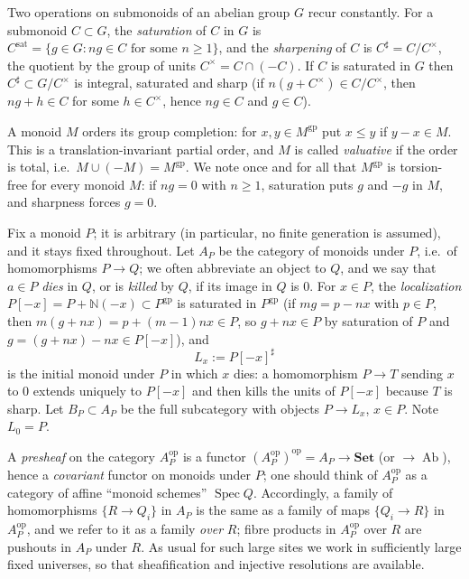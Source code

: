 \documentclass[12pt]{article}
\newcommand{\N}{\mathbb N}
\newcommand{\gp}{\mathrm{gp}}
\newcommand{\sat}{\mathrm{sat}}
\newcommand{\Ab}{\operatorname{Ab}}
\theoremstyle{definition}
\theoremstyle{remark}
\begin{document}
Two operations on submonoids of an abelian group \(G\) recur constantly.
For a submonoid \(C\subset G\), the \emph{saturation} of \(C\) in \(G\) is
\(C^{\sat}=\{g\in G:ng\in C\text{ for some }n\ge1\}\),
and the \emph{sharpening} of \(C\) is \(C^\sharp=C/C^\times\), the quotient by
the group of units \(C^\times=C\cap(-C)\).  If \(C\) is saturated in \(G\)
then \(C^\sharp\subset G/C^\times\) is integral, saturated and sharp
(if \(n(g+C^\times)\in C/C^\times\), then \(ng+h\in C\) for some
\(h\in C^\times\), hence \(ng\in C\) and \(g\in C\)).

A monoid \(M\) orders its group completion: for \(x,y\in M^{\gp}\) put
\(x\le y\) if \(y-x\in M\).  This is a translation-invariant partial order,
and \(M\) is called \emph{valuative} if the order is total, i.e.\
\(M\cup(-M)=M^{\gp}\).  We note once and for all that \(M^{\gp}\) is
torsion-free for every monoid \(M\): if \(ng=0\) with \(n\ge1\), saturation
puts \(g\) and \(-g\) in \(M\), and sharpness forces \(g=0\).

Fix a monoid \(P\); it is arbitrary (in particular, no finite generation
is assumed), and it stays fixed throughout.  Let \(A_P\) be the category of
monoids under \(P\),
i.e.\ of homomorphisms \(P\to Q\); we often abbreviate an object to \(Q\),
and we say that \(a\in P\) \emph{dies} in \(Q\), or is \emph{killed} by
\(Q\), if its image in \(Q\) is \(0\).
For \(x\in P\), the \emph{localization} \(P[-x]=P+\N(-x)\subset P^{\gp}\) is
saturated in \(P^{\gp}\) (if \(mg=p-nx\) with \(p\in P\), then
\(m(g+nx)=p+(m-1)nx\in P\), so \(g+nx\in P\) by saturation of \(P\) and
\(g=(g+nx)-nx\in P[-x]\)), and
\[
   L_x:=P[-x]^\sharp
\]
is the initial monoid under \(P\) in which \(x\) dies: a homomorphism
\(P\to T\) sending \(x\) to \(0\) extends uniquely to \(P[-x]\) and then
kills the units of \(P[-x]\) because \(T\) is sharp.  Let \(B_P\subset A_P\)
be the full subcategory with objects \(P\to L_x\), \(x\in P\).  Note
\(L_0=P\).

A \emph{presheaf} on the category \(A_P^{\mathrm{op}}\) is a functor
\((A_P^{\mathrm{op}})^{\mathrm{op}}=A_P\to\mathbf{Set}\) (or \(\to\Ab\)),
hence a \emph{covariant} functor on monoids under \(P\); one should think of
\(A_P^{\mathrm{op}}\) as a category of affine ``monoid schemes''
\(\operatorname{Spec}Q\).  Accordingly, a family of homomorphisms
\(\{R\to Q_i\}\) in \(A_P\) is the same as a family of maps
\(\{Q_i\to R\}\) in \(A_P^{\mathrm{op}}\), and we refer to it as a family
\emph{over} \(R\); fibre products in \(A_P^{\mathrm{op}}\) over \(R\) are
pushouts in \(A_P\) under \(R\).  As usual for such large sites we work in
sufficiently large fixed universes, so that sheafification and injective
resolutions are available.
\end{document}
